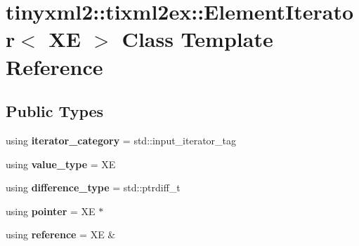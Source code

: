 \hypertarget{classtinyxml2_1_1tixml2ex_1_1_element_iterator}{}\section{tinyxml2\+:\+:tixml2ex\+:\+:Element\+Iterator$<$ XE $>$ Class Template Reference}
\label{classtinyxml2_1_1tixml2ex_1_1_element_iterator}
\subsection*{Public Types}
\begin{DoxyCompactItemize}
\item 
\mbox{\label{classtinyxml2_1_1tixml2ex_1_1_element_iterator_a13644d58da23dbe7d58c368a4471bf9b}} 
using {\bfseries iterator\+\_\+category} = std\+::input\+\_\+iterator\+\_\+tag
\item 
\mbox{\label{classtinyxml2_1_1tixml2ex_1_1_element_iterator_ac80eb65d6da0d86d308228833fe85b8d}} 
using {\bfseries value\+\_\+type} = XE
\item 
\mbox{\label{classtinyxml2_1_1tixml2ex_1_1_element_iterator_afe618afed4d86ba6bcca0eff2f6d2464}} 
using {\bfseries difference\+\_\+type} = std\+::ptrdiff\+\_\+t
\item 
\mbox{\label{classtinyxml2_1_1tixml2ex_1_1_element_iterator_a32ea643838ae40f2d45d38042c932dce}} 
using {\bfseries pointer} = XE $\ast$
\item 
\mbox{\label{classtinyxml2_1_1tixml2ex_1_1_element_iterator_a54998156f88a288d3eaf59672171b91a}} 
using {\bfseries reference} = XE \&
\end{DoxyCompactItemize}
